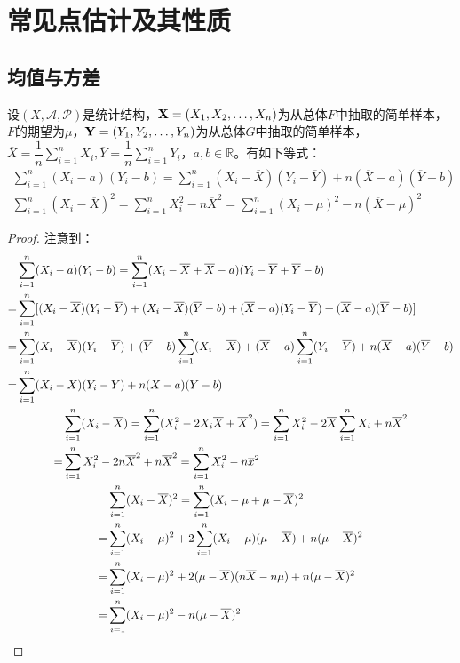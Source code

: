 \section{常见点估计及其性质}
\subsection{均值与方差}
\begin{theorem}\label{theo:xbar}
	设$(X,\mathscr{A},\mathscr{P})$是统计结构，$\mathbf{X}=(X_1, X_2, \dots, X_{n})$为从总体$F$中抽取的简单样本，$F$的期望为$\mu$，$\mathbf{Y}=(Y_1, Y_2, \dots, Y_{n})$为从总体$G$中抽取的简单样本，$\overline{X}=\dfrac{1}{n}\sum\limits_{i=1}^{n}X_i,\overline{Y}=\dfrac{1}{n}\sum\limits_{i=1}^{n}Y_i$，$a,b\in\mathbb{R}$。有如下等式：
	\begin{gather*}
		\sum_{i=1}^{n}(X_i-a)(Y_i-b)=\sum_{i=1}^{n}(X_i-\overline{X})(Y_i-\overline{Y})+n(\overline{X}-a)(\overline{Y}-b) \\
		\sum_{i=1}^{n}(X_i-\overline{X})^2=\sum_{i=1}^{n}X_i^2-n\overline{X}^2=\sum_{i=1}^{n}(X_i-\mu)^2-n(\overline{X}-\mu)^2
	\end{gather*}
\end{theorem}
\begin{proof}
	注意到：
	\begin{gather*}
		\begin{aligned}
			&\sum_{i=1}^{n}(X_i-a)(Y_i-b)=\sum_{i=1}^{n}(X_i-\overline{X}+\overline{X}-a)(Y_i-\overline{Y}+\overline{Y}-b)  \\
			=&\sum_{i=1}^{n}[(X_i-\overline{X})(Y_i-\overline{Y})+(X_i-\overline{X})(\overline{Y}-b)+(\overline{X}-a)(Y_i-\overline{Y})+(\overline{X}-a)(\overline{Y}-b)] \\
			=&\sum_{i=1}^{n}(X_i-\overline{X})(Y_i-\overline{Y})+(\overline{Y}-b)\sum_{i=1}^{n}(X_i-\overline{X})+(\overline{X}-a)\sum_{i=1}^{n}(Y_i-\overline{Y})+n(\overline{X}-a)(\overline{Y}-b) \\
			=&\sum_{i=1}^{n}(X_i-\overline{X})(Y_i-\overline{Y})+n(\overline{X}-a)(\overline{Y}-b)
		\end{aligned} \\
		\begin{aligned}
			&\sum_{i=1}^{n}(X_i-\overline{X})=\sum_{i=1}^{n}(X_i^2-2X_i\overline{X}+\overline{X}^2)=\sum_{i=1}^{n}X_i^2-2\overline{X}\sum_{i=1}^{n}X_i+n\overline{X}^2 \\
			=&\sum_{i=1}^{n}X_i^2-2n\overline{X}^2+n\overline{X}^2=\sum_{i=1}^{n}X_i^2-n\overline{x}^2
		\end{aligned} \\
		\begin{aligned}
			&\sum_{i=1}^{n}(X_i-\overline{X})^2=\sum_{i=1}^{n}(X_i-\mu+\mu-\overline{X})^2 \\
			=&\sum_{i=1}^{n}(X_i-\mu)^2+2\sum_{i=1}^{n}(X_i-\mu)(\mu-\overline{X})+n(\mu-\overline{X})^2 \\
			=&\sum_{i=1}^{n}(X_i-\mu)^2+2(\mu-\overline{X})(n\overline{X}-n\mu)+n(\mu-\overline{X})^2 \\
			=&\sum_{i=1}^{n}(X_i-\mu)^2-n(\mu-\overline{X})^2
		\end{aligned}\qedhere
	\end{gather*}
\end{proof}
